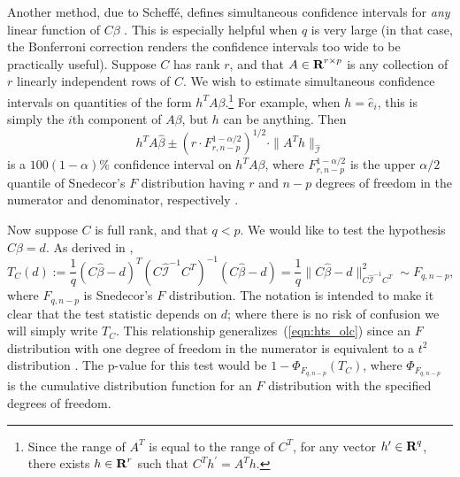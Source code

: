 \documentclass[12pt]{article}
\begin{document}
Another method, due to Scheff\'e, defines simultaneous confidence intervals for \textit{any} linear function of $C\beta$ \cite{Scheffe:1959}. This is especially helpful when $q$ is very large (in that case, the Bonferroni correction renders the confidence intervals too wide to be practically useful). Suppose $C$ has rank $r$, and that $A \in {\mbox{\bf R}}^{r \times p}$ is any collection of $r$ linearly independent rows of $C$. We wish to estimate simultaneous confidence intervals on quantities of the form $h^T A \beta$.\footnote{Since the range of $A^T$ is equal to the range of $C^T$, for any vector $h^\prime \in {\mbox{\bf R}}^q$, there exists $h \in {\mbox{\bf R}}^r$ such that $C^T h^\prime = A^T h$.} For example, when $h = \hat{e}_i$, this is simply the $i$th component of $A \beta$, but $h$ can be anything. Then
\begin{displaymath}
   h^T A \hat{\beta} \pm (r \cdot F_{r, n-p}^{1-\alpha/2})^{1/2} \cdot \| A^T h \|_{\hat{\mathcal{I}}}
\end{displaymath}
is a $100(1-\alpha)\%$ confidence interval on $h^T A \beta$, where $F_{r, n-p}^{1-\alpha/2}$ is the upper $\alpha/2$ quantile of Snedecor's $F$ distribution having $r$ and $n-p$ degrees of freedom in the numerator and denominator, respectively \cite[\S~5.1.1]{Seber:2003}.

Now suppose $C$ is full rank, and that $q < p$. We would like to test the hypothesis $C \beta = d$. As derived in \cite[\S~1.3.4]{Wood:2017},
\begin{equation}\label{eqn:f_test}
   T_C(d) := \frac{1}{q} (C \hat{\beta} - d)^T (C \hat{\mathcal{I}}^{-1} C^T)^{-1} (C \hat{\beta} - d) = \frac{1}{q}\| C \hat{\beta} - d \|_{C \hat{\mathcal{I}}^{-1} C^T}^2 \sim F_{q, n-p},
\end{equation}
where $F_{q, n-p}$ is Snedecor's $F$ distribution. The notation is intended to make it clear that the test statistic depends on $d$; where there is no risk of confusion we will simply write $T_C$. This relationship generalizes~(\ref{eqn:hts_olc}) since an $F$ distribution with one degree of freedom in the numerator is equivalent to a $t^2$ distribution \cite[\S~3.5.3]{Weisberg:2005}. The p-value for this test would be $1 - \Phi_{F_{q, n-p}}(T_C)$, where $\Phi_{F_{q, n-p}}$ is the cumulative distribution function for an $F$ distribution with the specified degrees of freedom.
\end{document}
